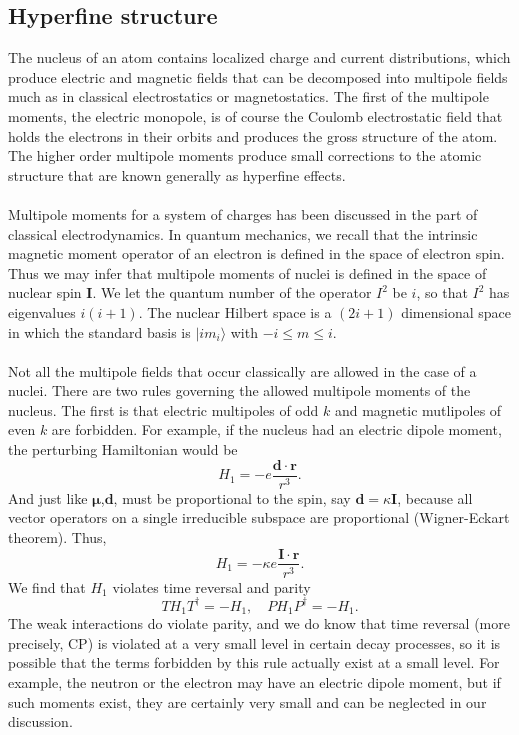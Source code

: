 \subsection{Hyperfine structure}
The nucleus of an atom contains localized charge and current distributions, which produce electric and magnetic fields that can be decomposed into multipole fields much as in classical electrostatics or magnetostatics.
The first of the multipole moments, the electric monopole, is of course the Coulomb electrostatic field that holds the electrons in their orbits and produces the gross structure of the atom.
The higher order multipole moments produce small corrections to the atomic structure that are known generally as hyperfine effects.
\\ \\
Multipole moments for a system of charges has been discussed in the part of classical electrodynamics. In quantum mechanics, we recall that the intrinsic magnetic moment operator of an electron is defined in the space of electron spin. Thus we may infer that multipole moments of nuclei is defined in the space of nuclear spin $\bm{I}$. 
We let the quantum number of the operator $I^2$ be $i$, so that $I^2$ has eigenvalues $i(i+1)$. The nuclear Hilbert space is a  $(2i+1)$ dimensional space in which the standard basis is $|im_i\rangle$ with $-i \leq m \leq i$.\\ \\
Not all the multipole fields that occur classically are allowed in the case of a nuclei. There are two rules governing the allowed multipole moments of the nucleus.
The first is that electric multipoles of odd $k$ and magnetic mutlipoles of even $k$ are forbidden. For example, if the nucleus had an electric dipole moment, the perturbing Hamiltonian would be
\[H_1 = -e \frac{\bm{d}\cdot\bm{r}}{r^3}.\]
And just like $\bm{\mu}$,$\bm{d}$, must be proportional to the spin, say $\bm{d} = \kappa\bm{I}$, because all vector operators on a single irreducible subspace are proportional (Wigner-Eckart theorem). Thus,
\[H_1 = -\kappa e \frac{\bm{I}\cdot\bm{r}}{r^3}.\]
We find that $H_1$ violates time reversal and parity
\[T H_1 T^{\dagger} = -H_1 , \quad P H_1 P^{\dagger} = -H_1.\]
The weak interactions do violate parity, and we do know that time reversal (more precisely, CP) is violated at a very small  level in certain decay processes, so it is possible that the terms forbidden by this rule actually exist at a small level. For example, the neutron or the electron may have an electric dipole moment, but if such moments exist, they are certainly very small and can be neglected in our discussion.
